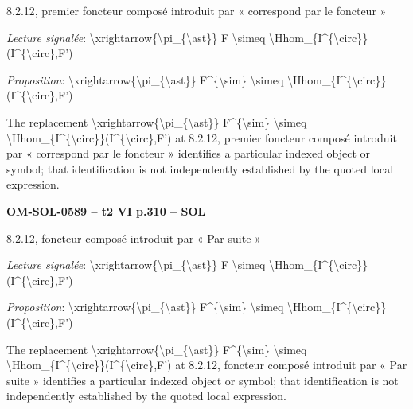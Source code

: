 8.2.12, premier foncteur composé introduit par « correspond par le foncteur »\par
\emph{Lecture signalée}: \textbackslash{}xrightarrow\{\textbackslash{}pi\_\{\textbackslash{}ast\}\} F \textbackslash{}simeq \textbackslash{}Hhom\_\{I\textasciicircum{}\{\textbackslash{}circ\}\}(I\textasciicircum{}\{\textbackslash{}circ\},F')\par
\emph{Proposition}: \textbackslash{}xrightarrow\{\textbackslash{}pi\_\{\textbackslash{}ast\}\} F\textasciicircum{}\{\textbackslash{}sim\} \textbackslash{}simeq \textbackslash{}Hhom\_\{I\textasciicircum{}\{\textbackslash{}circ\}\}(I\textasciicircum{}\{\textbackslash{}circ\},F')\par
The replacement \textbackslash{}xrightarrow\{\textbackslash{}pi\_\{\textbackslash{}ast\}\} F\textasciicircum{}\{\textbackslash{}sim\} \textbackslash{}simeq \textbackslash{}Hhom\_\{I\textasciicircum{}\{\textbackslash{}circ\}\}(I\textasciicircum{}\{\textbackslash{}circ\},F') at 8.2.12, premier foncteur composé introduit par « correspond par le foncteur » identifies a particular indexed object or symbol; that identification is not independently established by the quoted local expression.\par
\par\noindent\textbf{OM-SOL-0589 -- t2 VI p.310 -- SOL}\par
8.2.12, foncteur composé introduit par « Par suite »\par
\emph{Lecture signalée}: \textbackslash{}xrightarrow\{\textbackslash{}pi\_\{\textbackslash{}ast\}\} F \textbackslash{}simeq \textbackslash{}Hhom\_\{I\textasciicircum{}\{\textbackslash{}circ\}\}(I\textasciicircum{}\{\textbackslash{}circ\},F')\par
\emph{Proposition}: \textbackslash{}xrightarrow\{\textbackslash{}pi\_\{\textbackslash{}ast\}\} F\textasciicircum{}\{\textbackslash{}sim\} \textbackslash{}simeq \textbackslash{}Hhom\_\{I\textasciicircum{}\{\textbackslash{}circ\}\}(I\textasciicircum{}\{\textbackslash{}circ\},F')\par
The replacement \textbackslash{}xrightarrow\{\textbackslash{}pi\_\{\textbackslash{}ast\}\} F\textasciicircum{}\{\textbackslash{}sim\} \textbackslash{}simeq \textbackslash{}Hhom\_\{I\textasciicircum{}\{\textbackslash{}circ\}\}(I\textasciicircum{}\{\textbackslash{}circ\},F') at 8.2.12, foncteur composé introduit par « Par suite » identifies a particular indexed object or symbol; that identification is not independently established by the quoted local expression.\par
